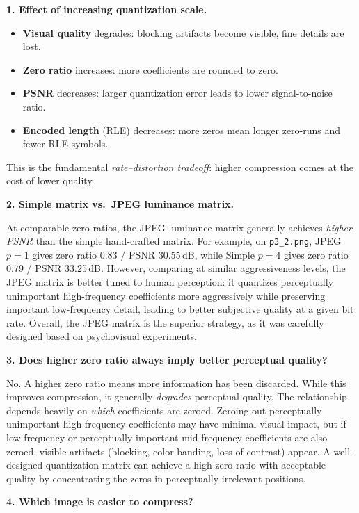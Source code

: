 \documentclass[11pt,a4paper]{article}
\begin{document}
\textbf{1. Effect of increasing quantization scale.}
\begin{itemize}[nosep]
  \item \textbf{Visual quality} degrades: blocking artifacts become visible, fine details are lost.
  \item \textbf{Zero ratio} increases: more coefficients are rounded to zero.
  \item \textbf{PSNR} decreases: larger quantization error leads to lower signal-to-noise ratio.
  \item \textbf{Encoded length} (RLE) decreases: more zeros mean longer zero-runs and fewer RLE symbols.
\end{itemize}
This is the fundamental \emph{rate--distortion tradeoff}: higher compression comes at the cost of lower quality.

\medskip
\textbf{2. Simple matrix vs.\ JPEG luminance matrix.}

At comparable zero ratios, the JPEG luminance matrix generally achieves \emph{higher PSNR} than the simple hand-crafted matrix.  For example, on \texttt{p3\_2.png}, JPEG $p=1$ gives zero ratio 0.83 / PSNR 30.55\,dB, while Simple $p=4$ gives zero ratio 0.79 / PSNR 33.25\,dB.  However, comparing at similar aggressiveness levels, the JPEG matrix is better tuned to human perception: it quantizes perceptually unimportant high-frequency coefficients more aggressively while preserving important low-frequency detail, leading to better subjective quality at a given bit rate.  Overall, the JPEG matrix is the superior strategy, as it was carefully designed based on psychovisual experiments.

\medskip
\textbf{3. Does higher zero ratio always imply better perceptual quality?}

No.  A higher zero ratio means more information has been discarded.  While this improves compression, it generally \emph{degrades} perceptual quality.  The relationship depends heavily on \emph{which} coefficients are zeroed.  Zeroing out perceptually unimportant high-frequency coefficients may have minimal visual impact, but if low-frequency or perceptually important mid-frequency coefficients are also zeroed, visible artifacts (blocking, color banding, loss of contrast) appear.  A well-designed quantization matrix can achieve a high zero ratio with acceptable quality by concentrating the zeros in perceptually irrelevant positions.

\medskip
\textbf{4. Which image is easier to compress?}
\end{document}
